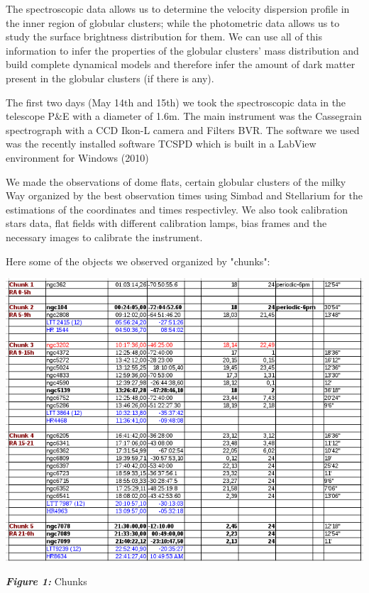 \documentclass[english]{article}
\begin{document}
The spectroscopic data allows us to determine the velocity dispersion profile in the inner region of globular clusters; while the photometric data allows us to study the surface brightness distribution for them. We can use all of this information to infer the properties of the globular clusters' mass distribution and build complete dynamical models and therefore infer the amount of dark matter present in the globular clusters (if there is any).

The first two days (May 14th and 15th) we took the spectroscopic data in the telescope P\&E with a diameter of 1.6m. The main instrument was the Cassegrain spectrograph with a CCD Ikon-L camera and Filters BVR. The software we used was the recently installed software TCSPD which is built in a LabView environment for Windows (2010)

We made the observations of dome flats, certain globular clusters of the milky Way organized by the best observation times using Simbad and Stellarium for the estimations of the coordinates and times respectivley. We also took calibration stars data, flat fields with different calibration lamps, bias frames and the necessary images to calibrate the instrument.

Here some of the objects we observed organized by "chunks":

\begin{center}
\includegraphics[scale=0.5]{9.png}

\textit{\textbf{Figure 1:}} Chunks
\end{center}
\end{document}
